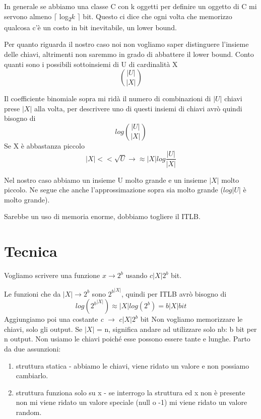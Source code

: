 \documentclass[12pt,italian]{report}
\begin{document}
\bigbreak
In generale se abbiamo una classe C con k oggetti per definire un oggetto di C mi servono almeno $\lceil$ log\textsubscript{2}$k$ $\rceil$ bit. Questo ci dice che ogni volta che memorizzo qualcosa c'è un costo in bit inevitabile, un lower bound.

Per quanto riguarda il nostro caso noi non vogliamo saper distinguere l'insieme delle chiavi, altrimenti non saremmo in grado di abbattere il lower bound. 
\bigbreak
\noindent Conto quanti sono i possibili sottoinsiemi di U di cardinalità X
\begin{equation}
    \binom{|U|}{|X|}
\end{equation}

\noindent Il coefficiente binomiale sopra mi ridà il numero di combinazioni di $|U|$ chiavi prese $|X|$ alla volta, per descrivere uno di questi insiemi di chiavi avrò quindi bisogno di 
\begin{equation}
   log\binom{|U|}{|X|}
\end{equation}
\noindent Se X è abbastanza piccolo
\begin{equation}
   |X| << \sqrt{U} \longrightarrow \approx{|X|log\frac{|U|}{|X|} }
\end{equation}

\noindent Nel nostro caso abbiamo un insieme U molto grande e un insieme $|X|$ molto piccolo. Ne segue che anche l'approssimazione sopra sia molto grande ($log|U|$ è molto grande). 

Sarebbe un uso di memoria enorme, dobbiamo togliere il ITLB. 

\section{Tecnica}
\label{tecnica}
Vogliamo scrivere una funzione $x \rightarrow{2^b}$ usando $c|X|2^b$ bit.

\noindent Le funzioni che da $|X| \rightarrow{2^b}$ sono ${2^b}^{|X|}$, quindi per ITLB avrò bisogno di 
\begin{equation}
    log({2^b}^{|X|}) \approx |X|log(2^b) = b|X| bit
\end{equation}
Aggiungiamo poi una costante \textit{c} $\rightarrow$ $c|X|2^b$ bit
\bigbreak
Non vogliamo memorizzare le chiavi, solo gli output. Se $|X|$ = n, significa andare ad utilizzare solo nb: b bit per n output. Non usiamo le chiavi poiché esse possono essere tante e lunghe.
\bigbreak
Parto da due assunzioni:
\begin{enumerate}
    \item struttura statica - abbiamo le chiavi, viene ridato un valore e non possiamo cambiarlo.
    \item struttura funziona solo su x - se interrogo la struttura ed x non è presente non mi viene ridato un valore speciale (null o -1) mi viene ridato un valore random.
\end{enumerate}
\end{document}
